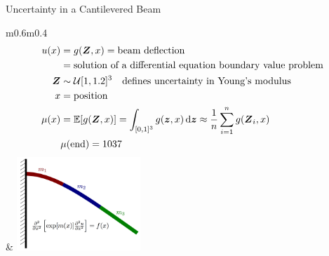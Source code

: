 \documentclass[10pt,compress,xcolor={usenames,dvipsnames},aspectratio=169]{beamer}
\begin{document}
\begin{frame}{Uncertainty in a Cantilevered Beam}
	\vspace{-4ex}
	\begin{tabular}{m{}m{}}
		\[
		\begin{aligned}
			u(x) & = g(\boldsymbol{Z}, x) = \text{beam deflection} \\
			& = \text{solution of a differential equation boundary value problem} \\
			\boldsymbol{Z} & \sim \mathcal{U}[1,1.2]^3 \quad \text{defines uncertainty in Young's modulus} \\
			x &= \text{position} \\
			\mu(x) &= \operatorname{\mathbb{E}}[g(\boldsymbol{Z},x)] = \int_{[0,1]^3}  g(\boldsymbol{z},x) \, {\rm d} \boldsymbol{z} \approx \frac 1n \sum_{i=1}^n g(\boldsymbol{Z}_i,x)
			\\
			& \mu(\text{end}) = 1037
		\end{aligned}
		\]
		&
		\centering
		\vspace{1.5ex}
		\includegraphics[width=0.35\textwidth]{BeamDrawing.png} \newline
	\end{tabular}


\end{frame}
\end{document}
